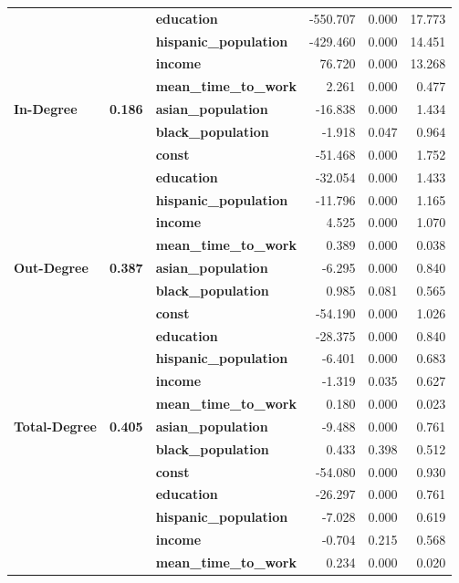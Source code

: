 \begin{tabular}{lllrrr}
             &       & \textbf{education} & -550.707 &    0.000 &   17.773 \\
             &       & \textbf{hispanic\_population} & -429.460 &    0.000 &   14.451 \\
             &       & \textbf{income} &   76.720 &    0.000 &   13.268 \\
             &       & \textbf{mean\_time\_to\_work} &    2.261 &    0.000 &    0.477 \\
\cline{1-6}
\cline{2-6}
\multirow{7}{*}{\textbf{In-Degree}} & \multirow{7}{*}{\textbf{0.186}} & \textbf{asian\_population} &  -16.838 &    0.000 &    1.434 \\
             &       & \textbf{black\_population} &   -1.918 &    0.047 &    0.964 \\
             &       & \textbf{const} &  -51.468 &    0.000 &    1.752 \\
             &       & \textbf{education} &  -32.054 &    0.000 &    1.433 \\
             &       & \textbf{hispanic\_population} &  -11.796 &    0.000 &    1.165 \\
             &       & \textbf{income} &    4.525 &    0.000 &    1.070 \\
             &       & \textbf{mean\_time\_to\_work} &    0.389 &    0.000 &    0.038 \\
\cline{1-6}
\cline{2-6}
\multirow{7}{*}{\textbf{Out-Degree}} & \multirow{7}{*}{\textbf{0.387}} & \textbf{asian\_population} &   -6.295 &    0.000 &    0.840 \\
             &       & \textbf{black\_population} &    0.985 &    0.081 &    0.565 \\
             &       & \textbf{const} &  -54.190 &    0.000 &    1.026 \\
             &       & \textbf{education} &  -28.375 &    0.000 &    0.840 \\
             &       & \textbf{hispanic\_population} &   -6.401 &    0.000 &    0.683 \\
             &       & \textbf{income} &   -1.319 &    0.035 &    0.627 \\
             &       & \textbf{mean\_time\_to\_work} &    0.180 &    0.000 &    0.023 \\
\cline{1-6}
\cline{2-6}
\multirow{7}{*}{\textbf{Total-Degree}} & \multirow{7}{*}{\textbf{0.405}} & \textbf{asian\_population} &   -9.488 &    0.000 &    0.761 \\
             &       & \textbf{black\_population} &    0.433 &    0.398 &    0.512 \\
             &       & \textbf{const} &  -54.080 &    0.000 &    0.930 \\
             &       & \textbf{education} &  -26.297 &    0.000 &    0.761 \\
             &       & \textbf{hispanic\_population} &   -7.028 &    0.000 &    0.619 \\
             &       & \textbf{income} &   -0.704 &    0.215 &    0.568 \\
             &       & \textbf{mean\_time\_to\_work} &    0.234 &    0.000 &    0.020 \\
\bottomrule
\end{tabular}
